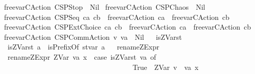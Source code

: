 \begin{isabellebody}
{\isacharbar}\ {\isachardoublequoteopen}free{\isacharunderscore}var{\isacharunderscore}CAction\ CSPStop\ {\isacharequal}\ Nil{\isachardoublequoteclose}\isanewline
{\isacharbar}\ {\isachardoublequoteopen}free{\isacharunderscore}var{\isacharunderscore}CAction\ CSPChaos\ {\isacharequal}\ Nil{\isachardoublequoteclose}\isanewline
{\isacharbar}\ {\isachardoublequoteopen}free{\isacharunderscore}var{\isacharunderscore}CAction\ {\isacharparenleft}CSPSeq\ ca\ cb{\isacharparenright}\ {\isacharequal}\ {\isacharparenleft}{\isacharparenleft}free{\isacharunderscore}var{\isacharunderscore}CAction\ ca{\isacharparenright}\ {\isacharat}\ {\isacharparenleft}free{\isacharunderscore}var{\isacharunderscore}CAction\ cb{\isacharparenright}{\isacharparenright}{\isachardoublequoteclose}\isanewline
{\isacharbar}\ {\isachardoublequoteopen}free{\isacharunderscore}var{\isacharunderscore}CAction\ {\isacharparenleft}CSPExtChoice\ ca\ cb{\isacharparenright}\ {\isacharequal}\ {\isacharparenleft}{\isacharparenleft}free{\isacharunderscore}var{\isacharunderscore}CAction\ ca{\isacharparenright}\ {\isacharat}\ {\isacharparenleft}free{\isacharunderscore}var{\isacharunderscore}CAction\ cb{\isacharparenright}{\isacharparenright}{\isachardoublequoteclose}\isanewline
{\isacharbar}\ {\isachardoublequoteopen}free{\isacharunderscore}var{\isacharunderscore}CAction\ {\isacharparenleft}CSPCommAction\ v\ va{\isacharparenright}\ {\isacharequal}\ Nil{\isachardoublequoteclose}\isanewline
\ \isanewline
{}\isamarkupfalse%
\ is{\isacharunderscore}ZVar{\isacharunderscore}st\isanewline
{}\isanewline
\ \ {\isachardoublequoteopen}is{\isacharunderscore}ZVar{\isacharunderscore}st\ a\ {\isacharequal}\ isPrefixOf\ {\isacharprime}{\isacharprime}st{\isacharunderscore}var{\isacharunderscore}{\isacharprime}{\isacharprime}\ a{\isachardoublequoteclose}\isanewline
\isanewline
\ \isanewline
{}\isamarkupfalse%
\ rename{\isacharunderscore}ZExpr\isanewline
{}\isanewline
\ \ {\isachardoublequoteopen}rename{\isacharunderscore}ZExpr\ {\isacharparenleft}ZVar\ {\isacharparenleft}va{\isacharcomma}\ x{\isacharparenright}{\isacharparenright}\ {\isacharequal}\ {\isacharparenleft}case\ {\isacharparenleft}is{\isacharunderscore}ZVar{\isacharunderscore}st\ va{\isacharparenright}\ of\isanewline
\ \ \ \ \ \ \ \ \ \ \ \ \ \ \ \ \ \ \ \ \ \ \ \ \ \ \ \ \ \ \ \ \ \ \ \ \ True\ {\isasymRightarrow}\ {\isacharparenleft}ZVar\ {\isacharparenleft}{\isacharprime}{\isacharprime}v{\isacharunderscore}{\isacharprime}{\isacharprime}\ {\isacharat}\ va{\isacharcomma}\ x{\isacharparenright}{\isacharparenright}\isanewline

\end{isabellebody}
